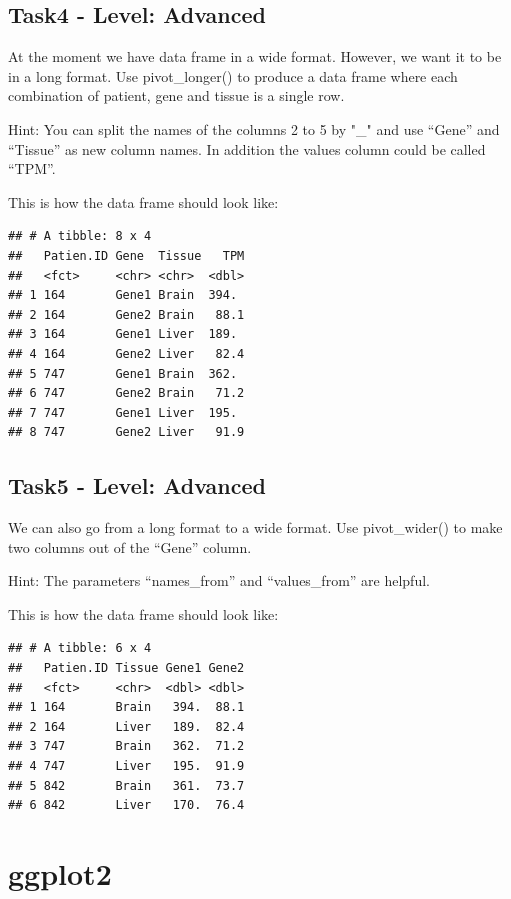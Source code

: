 \documentclass[
  7pt,
]{article}
\begin{document}
\hypertarget{task4---level-advanced}{%
\subsection{Task4 - Level: Advanced}\label{task4---level-advanced}}

At the moment we have data frame in a wide format. However, we want it
to be in a long format. Use pivot\_longer() to produce a data frame
where each combination of patient, gene and tissue is a single row.

Hint: You can split the names of the columns 2 to 5 by "\_" and use
``Gene'' and ``Tissue'' as new column names. In addition the values
column could be called ``TPM''.

This is how the data frame should look like:

\begin{verbatim}
## # A tibble: 8 x 4
##   Patien.ID Gene  Tissue   TPM
##   <fct>     <chr> <chr>  <dbl>
## 1 164       Gene1 Brain  394. 
## 2 164       Gene2 Brain   88.1
## 3 164       Gene1 Liver  189. 
## 4 164       Gene2 Liver   82.4
## 5 747       Gene1 Brain  362. 
## 6 747       Gene2 Brain   71.2
## 7 747       Gene1 Liver  195. 
## 8 747       Gene2 Liver   91.9
\end{verbatim}

\hypertarget{task5---level-advanced}{%
\subsection{Task5 - Level: Advanced}\label{task5---level-advanced}}

We can also go from a long format to a wide format. Use pivot\_wider()
to make two columns out of the ``Gene'' column.

Hint: The parameters ``names\_from'' and ``values\_from'' are helpful.

This is how the data frame should look like:

\begin{verbatim}
## # A tibble: 6 x 4
##   Patien.ID Tissue Gene1 Gene2
##   <fct>     <chr>  <dbl> <dbl>
## 1 164       Brain   394.  88.1
## 2 164       Liver   189.  82.4
## 3 747       Brain   362.  71.2
## 4 747       Liver   195.  91.9
## 5 842       Brain   361.  73.7
## 6 842       Liver   170.  76.4
\end{verbatim}

\hypertarget{ggplot2}{%
\section{ggplot2}\label{ggplot2}}
\end{document}
